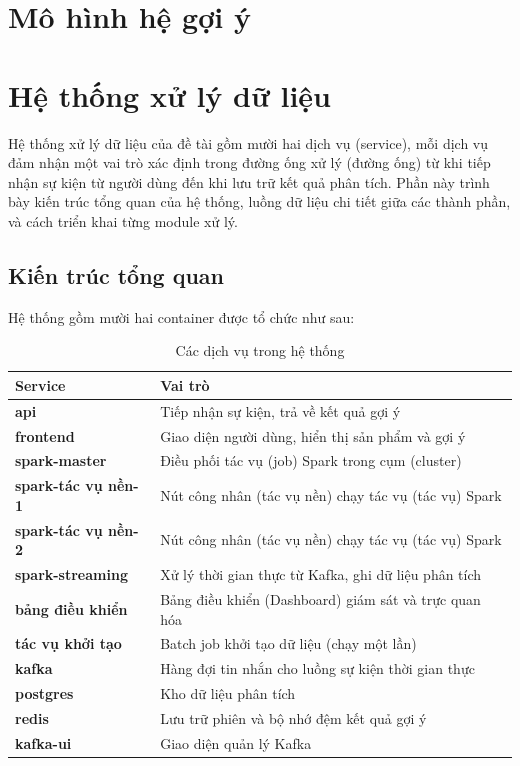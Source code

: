 \documentclass[../BTL.tex]{subfiles}
\begin{document}
\section{Mô hình hệ gợi ý}





\section{Hệ thống xử lý dữ liệu}
Hệ thống xử lý dữ liệu của đề tài gồm mười hai dịch vụ (service), mỗi dịch vụ đảm nhận một vai trò xác định trong đường ống xử lý (đường ống) từ khi tiếp nhận sự kiện từ người dùng đến khi lưu trữ kết quả phân tích. Phần này trình bày kiến trúc tổng quan của hệ thống, luồng dữ liệu chi tiết giữa các thành phần, và cách triển khai từng module xử lý.

\subsection{Kiến trúc tổng quan}
Hệ thống gồm mười hai container được tổ chức như sau:

\begin{table}[H]
\centering
\label{tab:services}
\begin{tabular}{|l|l|}
\hline
\textbf{Service} & \textbf{Vai trò} \\
\hline
\textbf{api} & Tiếp nhận sự kiện, trả về kết quả gợi ý \\
\hline
\textbf{frontend} & Giao diện người dùng, hiển thị sản phẩm và gợi ý \\
\hline
\textbf{spark-master} & Điều phối tác vụ (job) Spark trong cụm (cluster) \\
\hline
\textbf{spark-tác vụ nền-1} & Nút công nhân (tác vụ nền) chạy tác vụ (tác vụ) Spark \\
\hline
\textbf{spark-tác vụ nền-2} & Nút công nhân (tác vụ nền) chạy tác vụ (tác vụ) Spark \\
\hline
\textbf{spark-streaming} & Xử lý thời gian thực từ Kafka, ghi dữ liệu phân tích \\
\hline
\textbf{bảng điều khiển} & Bảng điều khiển (Dashboard) giám sát và trực quan hóa \\
\hline
\textbf{tác vụ khởi tạo} & Batch job khởi tạo dữ liệu (chạy một lần) \\
\hline
\textbf{kafka} & Hàng đợi tin nhắn cho luồng sự kiện thời gian thực \\
\hline
\textbf{postgres} & Kho dữ liệu phân tích \\
\hline
\textbf{redis} & Lưu trữ phiên và bộ nhớ đệm kết quả gợi ý \\
\hline
\textbf{kafka-ui} & Giao diện quản lý Kafka \\
\hline
\end{tabular}
\caption{Các dịch vụ trong hệ thống}
\end{table}
\end{document}

